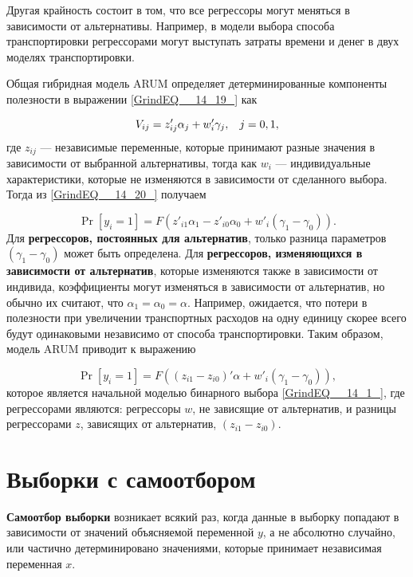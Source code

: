 Другая крайность состоит в том,  что все регрессоры могут меняться в зависимости от альтернативы. Например,  в модели выбора способа транспортировки регрессорами могут выступать затраты времени и денег в двух моделях транспортировки.

Общая гибридная модель ARUM определяет детерминированные компоненты полезности в выражении \eqref{GrindEQ__14_19_} как  

\begin{equation} 
\label{GrindEQ__14_22_} 
V_{ij} = z'_{ij} \alpha_j + w'_i\gamma_j, \hspace{0.3cm} j=0, 1,  
\end{equation} 
где $z_{ij}$ --- независимые переменные,  которые принимают разные значения в зависимости от выбранной альтернативы,  тогда как $w_i$ --- индивидуальные характеристики,  которые не изменяются в зависимости от сделанного выбора. Тогда из \eqref{GrindEQ__14_20_} получаем 

\[
\Pr[y_i=1] = F(z'_{i1} \alpha_1 - z'_{i0} \alpha_0 + w'_i(\gamma_1 - \gamma_0)).
\] 
Для \textbf{регрессоров,  постоянных для альтернатив},  только разница параметров $(\gamma_1 - \gamma_0)$ может быть определена. Для \textbf{регрессоров,  изменяющихся в зависимости от альтернатив}, которые изменяются также в зависимости от индивида,  коэффициенты могут изменяться в зависимости от альтернатив,  но обычно их считают, что $\alpha_1 = \alpha_0 = \alpha$. Например,  ожидается,  что потери в полезности при увеличении транспортных расходов на одну единицу скорее всего будут одинаковыми независимо от способа транспортировки. Таким образом, модель ARUM приводит к выражению

\begin{equation} 
\label{GrindEQ__14_23_} 
\Pr[y_i = 1] = F((z_{i1} - z_{i0})'\alpha + w'_i(\gamma_1 - \gamma_0)),  
\end{equation} 
которое является начальной моделью бинарного выбора \eqref{GrindEQ__14_1_},  где регрессорами являются: регрессоры $w$, не зависящие от альтернатив, и разницы регрессорами $z$, зависящих от альтернатив, $(z_{i1}-z_{i0})$. 

\section{ Выборки с самоотбором}

\textbf{Самоотбор выборки} возникает всякий раз,  когда данные в выборку попадают в зависимости от значений объясняемой  переменной $y$,  а не абсолютно случайно,  или частично детерминировано значениями,  которые принимает независимая переменная $x.$

